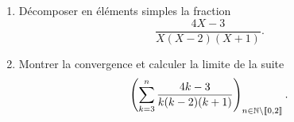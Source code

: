 \begin{enumerate}
 \item Décomposer en éléments simples la fraction 
\[
 \frac{4X-3}{X(X-2)(X+1)}.
\]

 \item Montrer la convergence et calculer la limite de la suite
\[
\left( \sum_{k=3}^{n}\frac{4k-3}{k(k-2)(k+1)}\right) _{n\in \mathbb{N} \setminus \llbracket 0,2 \rrbracket}.
\]
\end{enumerate}

 
